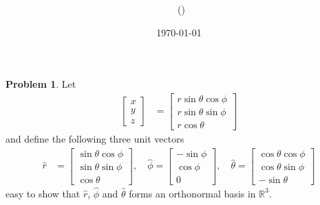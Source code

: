 \documentclass[twoside,11pt]{article}
\title{{\lms \Code \ \Ass}}
\author{\lms \name \ (\href{mailto:\mail}{\mail})}
\date{\sffamily \today}
\makeatletter
\newcommand{\lms}{\fontfamily{lmss}\selectfont} %
\newcommand{\RR}{\mathbb{R}}
\theoremstyle{definition}
\newtheorem{problem}{\lms Problem}
\theoremstyle{remark}
\newtheorem*{remark}{\lms Remark}
\renewcommand{\maketitle}{\bgroup\setlength{\parindent}{0pt}
\begin{flushleft}
  \textbf{\Large\@title}

  \@author
\end{flushleft}\egroup
}
\makeatother
\begin{document}
\maketitle
\thispagestyle{title}


\begin{problem}
Let 
\begin{align*}
    \begin{bmatrix}
        x\\y\\z 
    \end{bmatrix}
    &= 
    \begin{bmatrix}
        r \sin\theta\cos\phi \\
        r \sin\theta\sin\phi \\
        r \cos\theta 
    \end{bmatrix}
\end{align*}
and define the following three unit vectors
\begin{align*}
    \hat{r} &= \begin{bmatrix}
        \sin\theta\cos\phi\\
        \sin\theta\sin\phi\\
        \cos\theta
    \end{bmatrix},\quad
    \hat{\phi} = 
    \begin{bmatrix}
        -\sin\phi\\
        \cos\phi\\
        0
    \end{bmatrix},\quad
    \hat{\theta} = 
    \begin{bmatrix}
        \cos\theta\cos\phi\\
        \cos\theta\sin\phi\\
        -\sin\theta
    \end{bmatrix}
\end{align*}
easy to show that $\hat{r}$, $\hat{\phi}$ and $\hat{\theta}$ forms
an orthonormal basis in $\RR^3$.


\end{problem}
\end{document}
